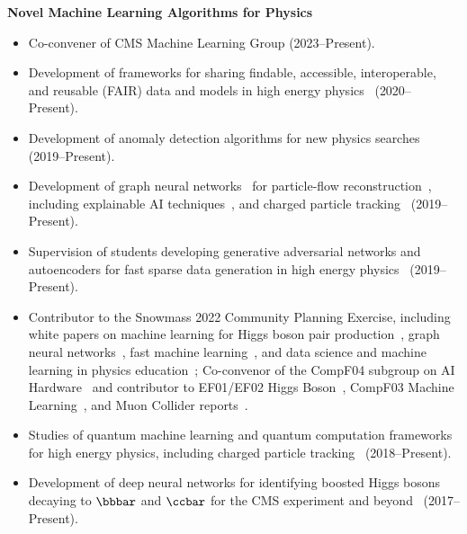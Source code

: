 \documentclass[11pt]{res}
\begin{document}
\begin{resume}
  \textbf{Novel Machine Learning Algorithms for Physics}
  \begin{itemize}
    \itemsep-0.3em
    \item Co-convener of CMS Machine Learning Group ({2023--Present}).
    \item Development of frameworks for sharing findable, accessible, interoperable, and reusable (FAIR) data and models in high energy physics~\cite{Huerta:2022kgj,Chen:2021euv} ({2020--Present}).
    \item Development of anomaly detection algorithms for new physics searches~\cite{Hao:2022zns,Govorkova:2021utb,Jawahar:2021vyu,Aarrestad:2021oeb,Tsan:2021brw,Kasieczka:2021xcg,Wozniak:2020} ({2019--Present}).
    \item Development of graph neural networks~\cite{Duarte:2020ngm} for particle-flow reconstruction~\cite{CMS-DP-2022-061,Pata:2022wam,CMS-DP-2021-030,Pata:2021oez}, including explainable AI techniques~\cite{Mokhtar:2022pwm,Mokhtar:2021bkf}, and charged particle tracking~\cite{Elabd:2021lgo,Dezoort:2021kfk,Heintz:2020soy} ({2019--Present}).
    \item Supervision of students developing generative adversarial networks and autoencoders for fast sparse data generation in high energy physics~\cite{Kansal:2022spb,Touranakou:2022qrp,Kansal:2021cqp,Orzari:2021suh,Kansal:2020svm} ({2019--Present}).
    \item Contributor to the Snowmass 2022 Community Planning Exercise, including white papers on machine learning for Higgs boson pair production~\cite{Apresyan:2022tqw}, graph neural networks~\cite{Thais:2022iok}, fast machine learning~\cite{Harris:2022qtm}, and data science and machine learning in physics education~\cite{Benelli:2022sqn}; Co-convenor of the CompF04 subgroup on AI Hardware~\cite{Bhimij:2022xyn} and contributor to EF01/EF02 Higgs Boson~\cite{Dawson:2022zbb}, CompF03 Machine Learning~\cite{Shanahan:2022ifi}, and Muon Collider reports~\cite{Black:2022cth}.
    \item Studies of quantum machine learning and quantum computation frameworks for high energy physics, including charged particle tracking~\cite{Zlokapa:2019tkn} ({2018--Present}).
    \item Development of deep neural networks for identifying boosted Higgs bosons decaying to $\bbbar$ and $\ccbar$ for the CMS experiment and beyond~\cite{CMS-DP-2022-041,Moreno:2019neq,Moreno:2019bmu,neurips2019_hbb,CMS-DP-2018-046} ({2017--Present}).
  \end{itemize}


\end{resume}
\end{document}
